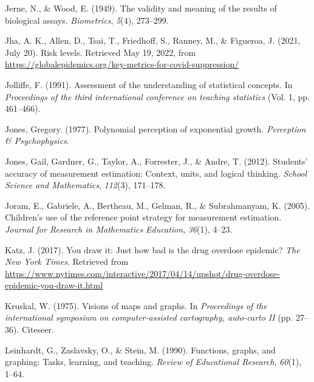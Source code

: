\documentclass[print]{nuthesis}
\newlength{\cslhangindent}
\newenvironment{CSLReferences}[2]%
{\setlength{\parindent}{0pt}%
\everypar{\setlength{\hangindent}{\cslhangindent}}\ignorespaces}%
{\par}
\begin{document}
\begin{CSLReferences}{1}{0}
\leavevmode{}%
Jerne, N., \& Wood, E. (1949). The validity and meaning of the results of biological assays. \emph{Biometrics}, \emph{5}(4), 273--299.

\leavevmode{}%
Jha, A. K., Allen, D., Tsai, T., Friedhoff, S., Ranney, M., \& Figueroa, J. (2021, July 20). Risk levels. Retrieved May 19, 2022, from \url{https://globalepidemics.org/key-metrics-for-covid-suppression/}

\leavevmode{}%
Jolliffe, F. (1991). Assessment of the understanding of statistical concepts. In \emph{Proceedings of the third international conference on teaching statistics} (Vol. 1, pp. 461--466).

\leavevmode{}%
Jones, Gregory. (1977). Polynomial perception of exponential growth. \emph{Perception \& Psychophysics}.

\leavevmode{}%
Jones, Gail, Gardner, G., Taylor, A., Forrester, J., \& Andre, T. (2012). Students' accuracy of measurement estimation: Context, units, and logical thinking. \emph{School Science and Mathematics}, \emph{112}(3), 171--178.

\leavevmode{}%
Joram, E., Gabriele, A., Bertheau, M., Gelman, R., \& Subrahmanyam, K. (2005). Children's use of the reference point strategy for measurement estimation. \emph{Journal for Research in Mathematics Education}, \emph{36}(1), 4--23.

\leavevmode{}%
Katz, J. (2017). You draw it: Just how bad is the drug overdose epidemic? \emph{The New York Times}. Retrieved from \url{https://www.nytimes.com/interactive/2017/04/14/upshot/drug-overdose-epidemic-you-draw-it.html}

\leavevmode{}%
Kruskal, W. (1975). Visions of maps and graphs. In \emph{Proceedings of the international symposium on computer-assisted cartography, auto-carto II} (pp. 27--36). Citeseer.

\leavevmode{}%
Leinhardt, G., Zaslavsky, O., \& Stein, M. (1990). Functions, graphs, and graphing: Tasks, learning, and teaching. \emph{Review of Educational Research}, \emph{60}(1), 1--64.


\end{CSLReferences}
\end{document}
